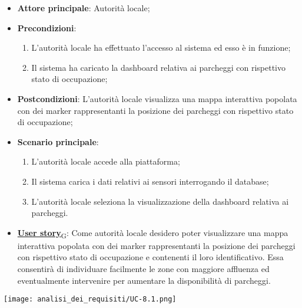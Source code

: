 \begin{itemize}
	\item \textbf{Attore principale}: Autorità locale;
	\item \textbf{Precondizioni}:
	      \begin{enumerate}
		      \item L'autorità locale ha effettuato l'accesso al sistema ed esso è in funzione;
		      \item Il sistema ha caricato la dashboard relativa ai parcheggi con rispettivo stato di occupazione;
	      \end{enumerate}
	\item \textbf{Postcondizioni}: L'autorità locale visualizza una mappa interattiva popolata con dei marker rappresentanti la posizione dei parcheggi con rispettivo stato di occupazione;
	\item \textbf{Scenario principale}:
	      \begin{enumerate}
		      \item L'autorità locale accede alla piattaforma;
		      \item Il sistema carica i dati relativi ai sensori interrogando il database;
		      \item L'autorità locale seleziona la visualizzazione della dashboard relativa ai parcheggi.
	      \end{enumerate}
	\item \href{https://7last.github.io/docs/rtb/documentazione-interna/glossario\#user-story}{\textbf{User story}\textsubscript{G}}:
	      Come autorità locale desidero poter visualizzare una mappa interattiva popolata con dei marker rappresentanti la posizione dei parcheggi con rispettivo stato di occupazione
	      e contenenti il loro identificativo. Essa consentirà di individuare facilmente le zone con maggiore affluenza ed eventualmente intervenire per aumentare la disponibilità di parcheggi.
\end{itemize}
\begin{center}
	\texttt{[image: analisi\_dei\_requisiti/UC-8.1.png]}
\end{center}

